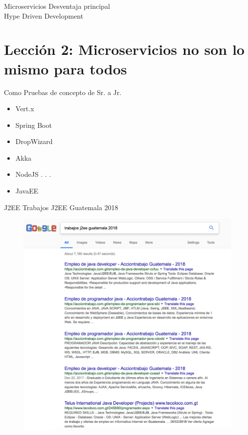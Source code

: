 \documentclass{beamer}
\begin{document}
\begin{frame}{Microservicios}
Desventaja principal \\

\huge Hype Driven Development
\end{frame}


\section{Lección 2: Microservicios no son lo mismo para todos}
\begin{frame}{Como}
Pruebas de concepto de Sr. a Jr.
\begin{itemize}
	\item Vert.x
	\item Spring Boot
	\item DropWizard
	\item Akka
	\item NodeJS
. . .
	\item JavaEE
\end{itemize}
\end{frame}

\begin{frame}{J2EE}
Trabajos J2EE Guatemala 2018
\begin{figure}
	\centering
	\includegraphics[width=\linewidth]{Images/javaee}
\end{figure}
\end{frame}
\end{document}
